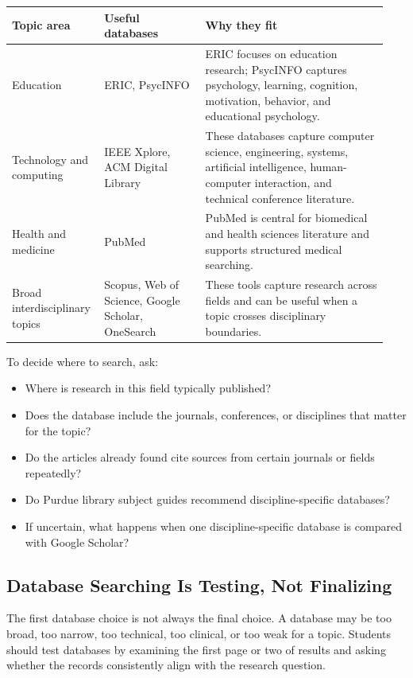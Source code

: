 \documentclass[11pt,letterpaper]{article}
\begin{document}
\begin{longtable}{@{}p{0.21\linewidth}p{0.26\linewidth}p{0.47\linewidth}@{}}
\toprule
\textbf{Topic area} & \textbf{Useful databases} & \textbf{Why they fit}\\
\midrule
Education & ERIC, PsycINFO & ERIC focuses on education research; PsycINFO captures psychology, learning, cognition, motivation, behavior, and educational psychology.\\
Technology and computing & IEEE Xplore, ACM Digital Library & These databases capture computer science, engineering, systems, artificial intelligence, human-computer interaction, and technical conference literature.\\
Health and medicine & PubMed & PubMed is central for biomedical and health sciences literature and supports structured medical searching.\\
Broad interdisciplinary topics & Scopus, Web of Science, Google Scholar, OneSearch & These tools capture research across fields and can be useful when a topic crosses disciplinary boundaries.\\
\bottomrule
\end{longtable}

To decide where to search, ask:

\begin{itemize}
  \item Where is research in this field typically published?
  \item Does the database include the journals, conferences, or disciplines that matter for the topic?
  \item Do the articles already found cite sources from certain journals or fields repeatedly?
  \item Do Purdue library subject guides recommend discipline-specific databases?
  \item If uncertain, what happens when one discipline-specific database is compared with Google Scholar?
\end{itemize}

\subsection{Database Searching Is Testing, Not Finalizing}

The first database choice is not always the final choice. A database may be too broad, too narrow, too technical, too clinical, or too weak for a topic. Students should test databases by examining the first page or two of results and asking whether the records consistently align with the research question.
\end{document}
